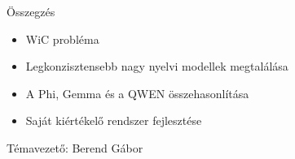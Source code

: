 \documentclass{beamer}
\begin{document}
    \begin{frame}{Összegzés}
        \begin{itemize}
            \item \large{WiC probléma}
            \item \large{Legkonzisztensebb nagy nyelvi modellek megtalálása}
            \item \large{A Phi, Gemma és a QWEN összehasonlítása}
            \item \large{Saját kiértékelő rendszer fejlesztése}
        \end{itemize}
        \vspace{1cm}
        \small{Témavezető: Berend Gábor}
    \end{frame}
\end{document}
